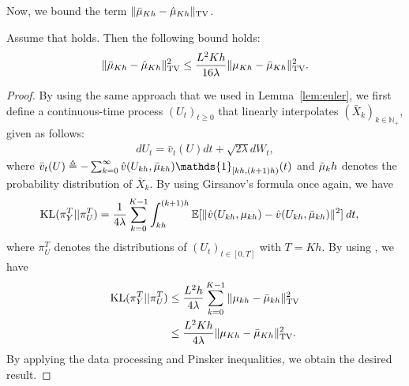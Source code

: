 Now, we bound the term $\| \bar{\mu}_{Kh} - \hat{\mu}_{Kh} \|_{\textnormal{TV}}$.
\begin{lemma}
\label{lem:euler2}
Assume that  holds. Then the following bound holds:
\begin{align}
\| \bar{\mu}_{Kh} - \hat{\mu}_{Kh} \|_{\textnormal{TV}}^2 \leq \frac{L^2 K h}{16 \lambda}  \|\mu_{Kh} - \bar{\mu}_{Kh} \|_{\textnormal{TV}}^2 .
\end{align}
\end{lemma}
%
\begin{proof}
By using the same approach that we used in Lemma~\ref{lem:euler}, we first define a continuous-time process $(U_t)_{t\geq 0}$ that linearly interpolates $(\bar{X}_k)_{k\in \mathbb{N}_+}$, given as follows: 
\begin{align}
d U_t = \bar{v}_t(U) dt + \sqrt{2 \lambda} dW_t, \label{eqn:sde_linear2}
\end{align}
where $\bar{v}_t(U) \triangleq - \sum_{k=0}^{\infty} \hat{v} (U_{kh}, \mub_{kh}) \mathds{1}_{[kh, (k+1)h)}(t)$ and $\bar{\mu}_kh$ denotes the probability distribution of $\bar{X}_k$. By using Girsanov's formula once again, we have
\begin{align}
\textnormal{KL} (\pi_{Y}^T || \pi_{U}^T) &= \frac1{4 \lambda} \sum_{k=0}^{K-1} \int_{kh}^{(k+1)h} \mathbb{E}[ \|\hat{v}(U_{kh}, \mu_{kh}) - \hat{v}(U_{kh},\bar{\mu}_{kh}) \|^2 ] \> dt,
\end{align}
where $\pi_U^T$ denotes the distributions of $(U_t)_{t \in [0,T]}$ with $T = Kh$. By using , we have
\begin{align}
\textnormal{KL} (\pi_{Y}^T || \pi_{U}^T) &\leq \frac{L^2 h}{4 \lambda} \sum_{k=0}^{K-1} \|\mu_{kh} - \bar{\mu}_{kh} \|_{\textnormal{TV}}^2   \\
&\leq \frac{L^2 K h}{4 \lambda}  \|\mu_{Kh} - \bar{\mu}_{Kh} \|_{\textnormal{TV}}^2  .
\end{align}
By applying the data processing and Pinsker inequalities, we obtain the desired result.
\end{proof}


